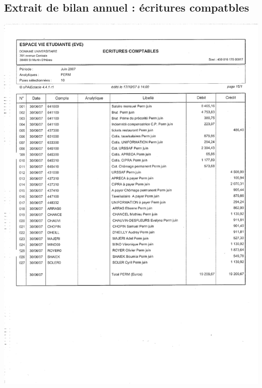 \subsection{Extrait de bilan annuel : écritures compatbles}
\begin{center}
\includegraphics[scale=0.7]{annexes/images/bilan_annuel_ecritures_comptables.pdf}
\end{center}
